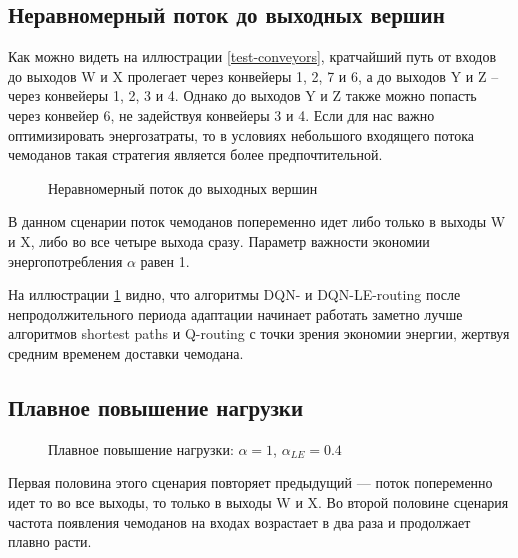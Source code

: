 \documentclass[specification,annotation,times]{itmo-student-thesis}
\theoremstyle{definition}
\begin{document}
\subsection{Неравномерный поток до выходных вершин}

Как можно видеть на иллюстрации \ref{test-conveyors}, кратчайший путь от входов
до выходов W и X пролегает через конвейеры 1, 2, 7 и 6, а до выходов Y и Z --
через конвейеры 1, 2, 3 и 4. Однако до выходов Y и Z также можно попасть через
конвейер 6, не задействуя конвейеры 3 и 4. Если для нас важно оптимизировать
энергозатраты, то в условиях небольшого входящего потока чемоданов такая
стратегия является более предпочтительной.

\begin{figure}[!h]
  \centering
  \hfil
  \caption{Неравномерный поток до выходных вершин}\label{experiments:conveyors:1}
\end{figure}

В данном сценарии поток чемоданов попеременно идет либо только в выходы W и X,
либо во все четыре выхода сразу. Параметр важности экономии энергопотребления
$\alpha$ равен 1.

На иллюстрации \ref{experiments:conveyors:1} видно, что алгоритмы DQN- и
DQN-LE-routing после непродолжительного периода адаптации начинает работать
заметно лучше алгоритмов shortest paths и Q-routing с точки зрения экономии энергии,
жертвуя средним временем доставки чемодана. 

\subsection{Плавное повышение нагрузки}

\begin{figure}[!h]
  \centering
  \hfil
  \caption{Плавное повышение нагрузки: $\alpha = 1$, $\alpha_{LE} = 0.4$}\label{experiments:conveyors:2-late}
\end{figure}

Первая половина этого сценария повторяет предыдущий --- поток попеременно идет то
во все выходы, то только в выходы W и X. Во второй половине сценария частота
появления чемоданов на входах возрастает в два раза и продолжает плавно расти.
\end{document}
